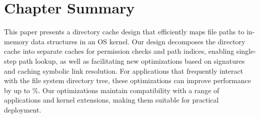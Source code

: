 \section{Chapter Summary}
\label{sec:dcache:summary}

This paper presents a directory cache design
that efficiently 
maps file paths to in-memory data structures
in an OS kernel.
Our design decomposes the directory cache into separate caches
for permission checks and path indices, enabling single-step path lookup,
as well as facilitating new optimizations based
on signatures and caching symbolic link resolution.
For applications that frequently 
interact with the file system directory tree, these optimizations 
can improve performance by up to \updatedbspeedup\%.
Our optimizations
maintain compatibility with a range of applications and kernel extensions,
making them suitable for practical deployment.

